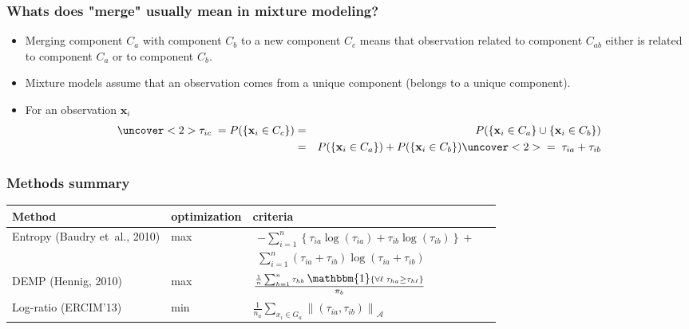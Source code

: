 \begin{frame}
\frametitle{Whats does "merge" usually mean  in mixture modeling?}
\begin{itemize}
\item Merging component $C_a$ with component $C_b$ to a new component $C_c$ means that observation related to component $C_{ab}$ either is related to component $C_a$ or to component $C_b$.
\item Mixture models assume that an observation comes from a unique component (belongs to a unique component).
\item For an observation $\textbf{x}_i$ 
\begin{eqnarray*} 
\uncover<2>{ \tau_{i c}  \;=\;} P( \{ \textbf{x}_i \in C_{c} \})  &=& P( \{ \textbf{x}_i \in C_{a} \} \cup \{ \textbf{x}_i \in C_{b} \} ) \\
&=& P( \{ \textbf{x}_i \in C_{a} \}) + P( \{ \textbf{x}_i \in C_{b} \} )  \uncover<2>{ \;=\; \tau_{i a} + \tau_{i b} }
\end{eqnarray*} 
\end{itemize}
\end{frame}


\begin{frame}
\frametitle{Methods summary}
\small
\begin{tabular}{ >{\centering}m{1.7in} | >{\centering}m{0.8in} | >{\centering}m{1.3in} m{0in}}
\textbf{Method} & \textbf{optimization} & \textbf{criteria} & \\\hline\hline
Entropy (Baudry et~al., 2010)     & max  & 
$\substack{- \sum_{i=1}^n \left\{ \tau_{i a} \log(\tau_{i a}) + \tau_{i b} \log(\tau_{i b})\right\} + \\
\sum_{i=1}^n  (\tau_{i a}+\tau_{i b}) \log(\tau_{i a} + \tau_{i b})}$  & \\ [2em]
\hline
DEMP    (Hennig, 2010)    & max & $\frac{ \frac{1}{n} \sum_{h=1}^n \tau_{hb} \; \mathlarger{\mathbbm{1}}\left\{ \forall \ell \; \tau_{ha} \geq \tau_{h\ell}  \right\}  }{ \pi_b }$ &\\ [2em]
\hline
Log-ratio (ERCIM'13)  & min & $\frac{1}{n_a} \sum_{x_i \in G_a} \left\| (\tau_{ia}, \tau_{ib}) \right\|_{\mathcal{A}}$ & \\ [2em]
\end{tabular}

\end{frame}

